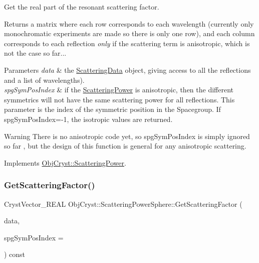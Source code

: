 Get the real part of the resonant scattering factor. 

\begin{DoxyReturn}{Returns}
a matrix where each row corresponds to each wavelength (currently only monochromatic experiments are made so there is only one row), and each column corresponds to each reflection {\itshape only} if the scattering term is anisotropic, which is not the case so far... 
\end{DoxyReturn}

\begin{DoxyParams}{Parameters}
{\em data} & the \mbox{\hyperlink{class_obj_cryst_1_1_scattering_data}{Scattering\+Data}} object, giving access to all the reflections and a list of wavelengths). \\
\hline
{\em spg\+Sym\+Pos\+Index} & if the \mbox{\hyperlink{class_obj_cryst_1_1_scattering_power}{Scattering\+Power}} is anisotropic, then the different symmetrics will not have the same scattering power for all reflections. This parameter is the index of the symmetric position in the Spacegroup. If spg\+Sym\+Pos\+Index=-\/1, the isotropic values are returned. \\
\hline
\end{DoxyParams}
\begin{DoxyWarning}{Warning}
There is no anisotropic code yet, so spg\+Sym\+Pos\+Index is simply ignored so far , but the design of this function is general for any anisotropic scattering. 
\end{DoxyWarning}


Implements \mbox{\hyperlink{class_obj_cryst_1_1_scattering_power_a42c1302254787d13b9e0f2210315291a}{Obj\+Cryst\+::\+Scattering\+Power}}.

\mbox{\label{class_obj_cryst_1_1_scattering_power_sphere_aad2a92da56fe7e50e585a0ad24da5c83}} 
\subsubsection{\texorpdfstring{GetScatteringFactor()}{GetScatteringFactor()}}
{\footnotesize\ttfamily Cryst\+Vector\+\_\+\+R\+E\+AL Obj\+Cryst\+::\+Scattering\+Power\+Sphere\+::\+Get\+Scattering\+Factor (\begin{DoxyParamCaption}\item[{const \mbox{\hyperlink{class_obj_cryst_1_1_scattering_data}{Scattering\+Data}} \&}]{data,  }\item[{const int}]{spg\+Sym\+Pos\+Index = {} }\end{DoxyParamCaption}) const\hspace{0.3cm}{\ttfamily [virtual]}}



